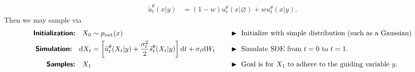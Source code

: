 \begin{summarybox}
\begin{align*}
    \tilde{u}^\theta_t(x|y) &= (1-w) u_t^\theta(x|\varnothing) + wu_t^\theta (x|y).
\end{align*}
Then we may sample via
\begin{alignat*}{3}
    \textbf{\sffamily Initialization:}\quad X_0&\sim\pinit(x) \quad  && \blacktriangleright\,\,\text{Initialize with simple distribution (such as a Gaussian)}\\
    \textbf{\sffamily Simulation:}\quad \dd X_t &= \left[\tilde{u}_t^\theta(X_t|y)+\frac{\sigma_t^2}{2}\tilde{s}_t^\theta(X_t|y)\right]\dd t + \sigma_t\dd W_t \quad && \blacktriangleright\,\,\text{Simulate SDE from $t=0$ to $t=1$.}\\
    \textbf{\sffamily Samples:}\quad X_1& \quad && \blacktriangleright\,\,\text{Goal is for $X_1$ to adhere to the guiding variable $y$.}
\end{alignat*}
\end{summarybox}

